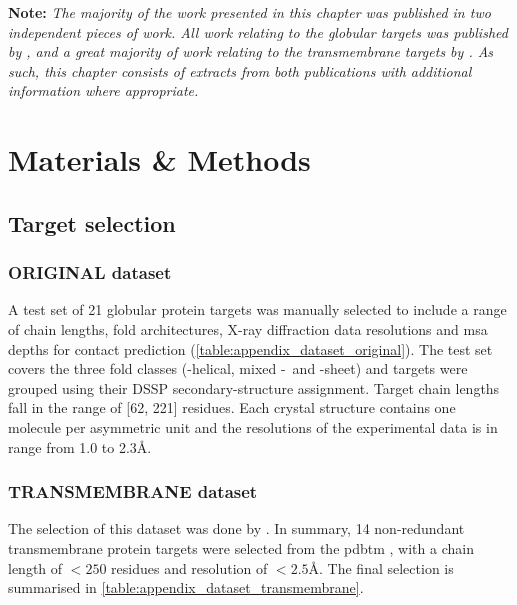\textbf{Note: }\textit{The majority of the work presented in this chapter was published in two independent pieces of work. All work relating to the globular targets was published by \textcite{Simkovic2016-wk}, and a great majority of work relating to the transmembrane targets by \textcite{Thomas2017-sh}. As such, this chapter consists of extracts from both publications with additional information where appropriate.}

\section{Materials \& Methods}
\subsection{Target selection}
\subsubsection{ORIGINAL dataset} \label{sec:methods_dataset_original}
A test set of 21 globular protein targets was manually selected to include a range of chain lengths, fold architectures, X-ray diffraction data resolutions and \gls{msa} depths for contact prediction  (\cref{table:appendix_dataset_original}). The test set covers the three fold classes (\textalpha-helical, mixed \textalpha-\textbeta\ and \textbeta-sheet) and targets were grouped using their DSSP \cite{Kabsch1983-rr} secondary-structure assignment. Target chain lengths fall in the range of [62, 221] residues. Each crystal structure contains one molecule per asymmetric unit and the resolutions of the experimental data is in range from 1.0 to 2.3\AA.


\subsubsection{TRANSMEMBRANE dataset} \label{sec:methods_dataset_transmembrane}
The selection of this dataset was done by \cite{Thomas2017-sh}. In summary, 14 non-redundant transmembrane protein targets were selected from the \gls{pdbtm} \cite{Tusnady2005-ns}, with a chain length of $<250$ residues and resolution of $<2.5$\AA. The final selection is summarised in \cref{table:appendix_dataset_transmembrane}.

